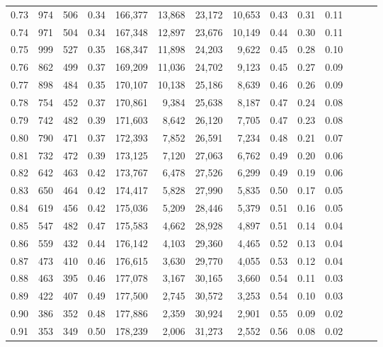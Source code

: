 \begin{tabular}{rrrrrrrrrrrrrr}
0.73 &    974 &  506 &  0.34 &  166,377 &   13,868 &  23,172 &  10,653 &  0.43 &  0.31 &      0.11 \\
0.74 &    971 &  504 &  0.34 &  167,348 &   12,897 &  23,676 &  10,149 &  0.44 &  0.30 &      0.11 \\
0.75 &    999 &  527 &  0.35 &  168,347 &   11,898 &  24,203 &   9,622 &  0.45 &  0.28 &      0.10 \\
0.76 &    862 &  499 &  0.37 &  169,209 &   11,036 &  24,702 &   9,123 &  0.45 &  0.27 &      0.09 \\
0.77 &    898 &  484 &  0.35 &  170,107 &   10,138 &  25,186 &   8,639 &  0.46 &  0.26 &      0.09 \\
0.78 &    754 &  452 &  0.37 &  170,861 &    9,384 &  25,638 &   8,187 &  0.47 &  0.24 &      0.08 \\
0.79 &    742 &  482 &  0.39 &  171,603 &    8,642 &  26,120 &   7,705 &  0.47 &  0.23 &      0.08 \\
0.80 &    790 &  471 &  0.37 &  172,393 &    7,852 &  26,591 &   7,234 &  0.48 &  0.21 &      0.07 \\
0.81 &    732 &  472 &  0.39 &  173,125 &    7,120 &  27,063 &   6,762 &  0.49 &  0.20 &      0.06 \\
0.82 &    642 &  463 &  0.42 &  173,767 &    6,478 &  27,526 &   6,299 &  0.49 &  0.19 &      0.06 \\
0.83 &    650 &  464 &  0.42 &  174,417 &    5,828 &  27,990 &   5,835 &  0.50 &  0.17 &      0.05 \\
0.84 &    619 &  456 &  0.42 &  175,036 &    5,209 &  28,446 &   5,379 &  0.51 &  0.16 &      0.05 \\
0.85 &    547 &  482 &  0.47 &  175,583 &    4,662 &  28,928 &   4,897 &  0.51 &  0.14 &      0.04 \\
0.86 &    559 &  432 &  0.44 &  176,142 &    4,103 &  29,360 &   4,465 &  0.52 &  0.13 &      0.04 \\
0.87 &    473 &  410 &  0.46 &  176,615 &    3,630 &  29,770 &   4,055 &  0.53 &  0.12 &      0.04 \\
0.88 &    463 &  395 &  0.46 &  177,078 &    3,167 &  30,165 &   3,660 &  0.54 &  0.11 &      0.03 \\
0.89 &    422 &  407 &  0.49 &  177,500 &    2,745 &  30,572 &   3,253 &  0.54 &  0.10 &      0.03 \\
0.90 &    386 &  352 &  0.48 &  177,886 &    2,359 &  30,924 &   2,901 &  0.55 &  0.09 &      0.02 \\
0.91 &    353 &  349 &  0.50 &  178,239 &    2,006 &  31,273 &   2,552 &  0.56 &  0.08 &      0.02 \\

\end{tabular}
